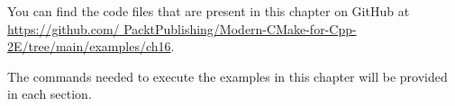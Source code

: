 You can find the code files that are present in this chapter on GitHub at \url{https://github.com/ PacktPublishing/Modern-CMake-for-Cpp-2E/tree/main/examples/ch16}.

The commands needed to execute the examples in this chapter will be provided in each section.